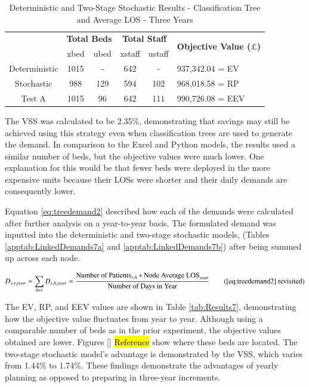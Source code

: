 \documentclass[../thesis.tex]{subfiles}
\begin{document}
\begin{table}[h!]
    \centering
    \begin{tabular}{cccccl}\toprule
 & \multicolumn{2}{l}{\textbf{Total Beds}} & \multicolumn{2}{c}{\textbf{Total Staff}} & \multirow{2}{*}{\textbf{Objective Value ($\pounds$)}}\\ \cmidrule(lr){2-3} \cmidrule(lr){4-5}
 & xbed           & ubed          & xstaff         & ustaff         \\ \midrule
    Deterministic      & 1015 & - & 642 & - & 937,342.04 = EV \\ \midrule
    Stochastic & 988 & 129 & 594&102 &  968,018.58 = RP \\ \midrule
    Test A & 1015  & 96 & 642 & 111 & 990,726.08 = EEV \\\bottomrule
    \end{tabular}
    \caption{Deterministic and Two-Stage Stochastic Results - Classification Tree and Average LOS - Three Years}
    \label{tab:Results6}
\end{table}

The VSS was calculated to be 2.35\%, demonstrating that savings may still be achieved using this strategy even when classification trees are used to generate the demand. In comparison to the Excel and Python models, the results used a similar number of beds, but the objective values were much lower. One explanation for this would be that fewer beds were deployed in the more expensive units because their LOSs were shorter and their daily demands are consequently lower.

Equation \eqref{eq:treedemand2} described how each of the demands were calculated after further analysis on a year-to-year basis. The formulated demand was inputted into the deterministic and two-stage stochastic models, (Tables \ref{apptab:LinkedDemands7a} and \ref{apptab:LinkedDemands7b}) after being summed up across each node.

\begin{equation}
        D_{s,r,year} = \sum\limits_{h \in r} D_{s,h,year} = \frac{\text{Number of Patients}_{s,h}* {\text{Node Average LOS}}_{year}}{\text{Number of Days in Year}} \tag{\ref{eq:treedemand2} revisited}
\end{equation}

The EV, RP, and EEV values are shown in Table \ref{tab:Results7}, demonstrating how the objective value fluctuates from year to year. Although using a comparable number of beds as in the prior experiment, the objective values obtained are lower. Figures \ref{} \hl{Reference} show where these beds are located. The two-stage stochastic model's advantage is demonstrated by the VSS, which varies from 1.44\% to 1.74\%. These findings demonstrate the advantages of yearly planning as opposed to preparing in three-year increments.
\end{document}
